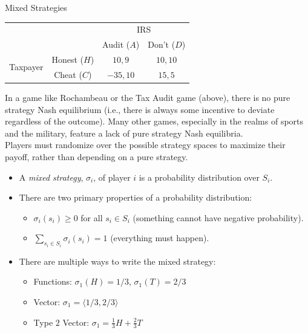 \documentclass[10pt]{extarticle}
\begin{document}
  \begin{problem}{Mixed Strategies}
    \begin{center}
      \renewcommand{\arraystretch}{1.5}
      \begin{tabular}{cc|c|c|}
        \multicolumn{1}{c}{}&\multicolumn{1}{c}{}&\multicolumn{2}{c}{IRS}\\
                            &\multicolumn{1}{c}{}&\multicolumn{1}{c}{Audit ($A$)} & \multicolumn{1}{c}{Don't ($D$)}\\
        \cline{3-4}
        \multirow{2}{4em}{Taxpayer} & Honest ($H$) & $10,9$ & $10,10$ \\
        \cline{3-4}
                                    & Cheat ($C$) & $-35,10$ & $15,5$\\
        \cline{3-4}
      \end{tabular}
    \end{center}
    In a game like Rochambeau or the Tax Audit game (above), there is no pure strategy Nash equilibrium (i.e., there is always some incentive to deviate regardless of the outcome). Many other games, especially in the realms of sports and the military, feature a lack of pure strategy Nash equilibria.\\

    Players must randomize over the possible strategy spaces to maximize their payoff, rather than depending on a pure strategy.
    \begin{itemize}
      \item A \textit{mixed strategy}, $\sigma_i$, of player $i$ is a probability distribution over $S_i$.
      \item There are two primary properties of a probability distribution:
        \begin{itemize}
          \item $\sigma_i(s_i) \geq 0$ for all $s_i \in S_i$ (something cannot have negative probability).
          \item $\sum_{s_i\in S_i}\sigma_i(s_i) = 1$ (everything must happen).
        \end{itemize}
      \item There are multiple ways to write the mixed strategy:
        \begin{itemize}
          \item Functions: $\sigma_1(H) = 1/3$, $\sigma_1(T) = 2/3$
          \item Vector: $\sigma_1 = \langle 1/3,2/3\rangle$
          \item Type $2$ Vector: $\sigma_1 = \frac{1}{3}H + \frac{2}{3}T$
        \end{itemize}
    \end{itemize}
  \end{problem}
\end{document}
